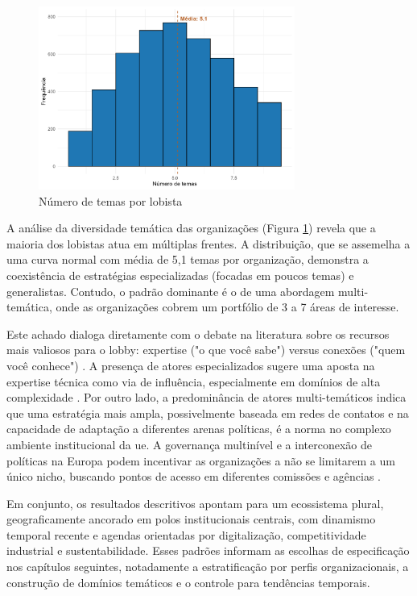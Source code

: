\begin{figure}[!htbp]
\centering
\includegraphics[width=0.75\textwidth]{figures/descriptives_lobbyists/histogram_themes_per_lobbyist.png}
\caption{Número de temas por lobista}
\label{fig:themes_per_lobbyist_hist}
\end{figure}

A análise da diversidade temática das organizações (Figura \ref{fig:themes_per_lobbyist_hist}) revela que a maioria dos lobistas atua em múltiplas frentes. A distribuição, que se assemelha a uma curva normal com média de 5,1 temas por organização, demonstra a coexistência de estratégias especializadas (focadas em poucos temas) e generalistas. Contudo, o padrão dominante é o de uma abordagem multi-temática, onde as organizações cobrem um portfólio de 3 a 7 áreas de interesse.

Este achado dialoga diretamente com o debate na literatura sobre os recursos mais valiosos para o lobby: expertise ("o que você sabe") versus conexões ("quem você conhece") \cite{bertrand2014whom}. A presença de atores especializados sugere uma aposta na expertise técnica como via de influência, especialmente em domínios de alta complexidade \cite{kluver_informational_2012}. Por outro lado, a predominância de atores multi-temáticos indica que uma estratégia mais ampla, possivelmente baseada em redes de contatos e na capacidade de adaptação a diferentes arenas políticas, é a norma no complexo ambiente institucional da \acrshort{ue}. A governança multinível e a interconexão de políticas na Europa podem incentivar as organizações a não se limitarem a um único nicho, buscando pontos de acesso em diferentes comissões e agências \cite{coen2019legislative}.

Em conjunto, os resultados descritivos apontam para um ecossistema plural, geograficamente ancorado em polos institucionais centrais, com dinamismo temporal recente e agendas orientadas por digitalização, competitividade industrial e sustentabilidade. Esses padrões informam as escolhas de especificação nos capítulos seguintes, notadamente a estratificação por perfis organizacionais, a construção de domínios temáticos e o controle para tendências temporais.


